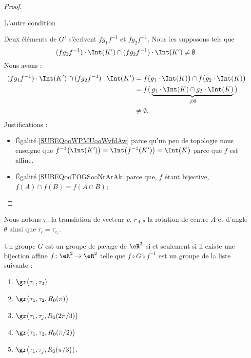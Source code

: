 \begin{proof}
\begin{subproof}
        \item[L'autre condition]

            Deux éléments de \( G'\) s'écrivent \( fg_1f^{-1}\) et \( fg_2f^{-1}\). Nous les supposons tels que
            \begin{equation}
                (fg_1f^{-1})\cdot \Int(K')\cap(f g_2 f^{-1})\cdot\Int(K')\neq \emptyset.
            \end{equation}
            Nous avons :
            \begin{subequations}
                \begin{align}
                    (fg_1f^{-1})\cdot \Int(K')\cap(f g_2 f^{-1})\cdot\Int(K')&=f\big( g_1\cdot\Int(K) \big)\cap f\big( g_2\cdot\Int(K) \big) \label{SUBEQooWPMUooWvfdAw}\\
                    &=f\big(  \underbrace{g_1\cdot\Int(K)\cap g_2\cdot\Int(K)}_{\neq \emptyset}  \big)        \label{SUBEQooTOGSooNrArAk}\\
                    &\neq \emptyset.
                \end{align}
            \end{subequations}
            Justifications :
            \begin{itemize}
                \item Égalité \eqref{SUBEQooWPMUooWvfdAw} parce qu'un peu de topologie nous enseigne que \( f^{-1}\big( \Int(K') \big)=  \Int\big( f^{-1}(K') \big)=\Int(K)  \) parce que \( f\) est affine.
                \item Égalité \eqref{SUBEQooTOGSooNrArAk} parce que, \( f\) étant bijective, \( f(A)\cap f(B)=f(A\cap B)\); 
            \end{itemize}

    \end{subproof}
\end{proof}


\begin{theorem}
    Nous notons \( \tau_v\) la translation de vecteur \( v\), \( r_{A,\theta}\) la rotation de centre \( A\) et d'angle \( \theta\) ainsi que \( \tau_i=\tau_{e_i}\).

    Un groupe \( G\) est un groupe de pavage de \( \eR^2\) si et seulement si il existe une bijection affine \( f\colon \eR^2\to \eR^2\) telle que \( f\circ G\circ f^{-1}\) est un groupe de la liste suivante :
    \begin{enumerate}
        \item
            \( \gr\big(\tau_1,\tau_2)\)
        \item
            \( \gr\big(\tau_1,\tau_2,R_0(\pi)\big)\)
        \item
            \( \gr\big(\tau_1,\tau_j,R_0(2\pi/3)\big)\)
        \item
            \( \gr\big(\tau_1,\tau_2,R_0(\pi/2)\big)\)
        \item
            \( \gr\big(\tau_1,\tau_j,R_0(\pi/3\big))\).
    \end{enumerate}
\end{theorem}

